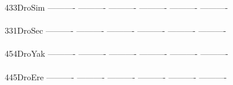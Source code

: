 \documentclass[11pt,twoside,reqno,a4paper]{article}
\begin{document}
{433\hspace*{2\charwidth}DroSim	----------	----------	----------	----------	----------	----------	\\
\hspace*{5\charwidth}\hspace*{7\charwidth}\hspace*{1\charwidth}\hspace*{1\charwidth}\hspace*{1\charwidth}\hspace*{1\charwidth}\hspace*{1\charwidth}\hspace*{1\charwidth}\\
331\hspace*{2\charwidth}DroSec	----------	----------	----------	----------	----------	----------	\\
\hspace*{5\charwidth}\hspace*{7\charwidth}\hspace*{1\charwidth}\hspace*{1\charwidth}\hspace*{1\charwidth}\hspace*{1\charwidth}\hspace*{1\charwidth}\hspace*{1\charwidth}\\
454\hspace*{2\charwidth}DroYak	----------	----------	----------	----------	----------	----------	\\
\hspace*{5\charwidth}\hspace*{7\charwidth}\hspace*{1\charwidth}\hspace*{1\charwidth}\hspace*{1\charwidth}\hspace*{1\charwidth}\hspace*{1\charwidth}\hspace*{1\charwidth}\\
445\hspace*{2\charwidth}DroEre	----------	----------	----------	----------	----------	----------	\\
\hspace*{5\charwidth}\hspace*{7\charwidth}\hspace*{1\charwidth}\hspace*{1\charwidth}\hspace*{1\charwidth}\hspace*{1\charwidth}\hspace*{1\charwidth}\hspace*{1\charwidth}\\
}
\end{document}
